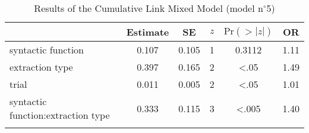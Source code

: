 \begin{table}
\begin{tabular}{l S[table-format=1.3] S[table-format=1.3] c S[table-format=<1.4] S[table-format=1.2]}
  \lsptoprule
 & {Estimate} & {SE} & {$z$} & {$\text{Pr}(>|z|)$} & {OR} \\ 
  \midrule
  syntactic function                 & 0.107 & 0.105 & 1 & 0.3112 & 1.11 \\ 
  extraction type                    & 0.397 & 0.165 & 2 & <.05 & 1.49 \\ 
  trial                              & 0.011 & 0.005 & 2 & <.05 & 1.01 \\ 
  syntactic function:extraction type & 0.333 & 0.115 & 3 & <.005 & 1.40 \\ 
   \lspbottomrule
\end{tabular}
\caption{Results of the Cumulative Link Mixed Model (model n$^{\circ}$5)}
\label{tab:exp12-m5}
\end{table}
